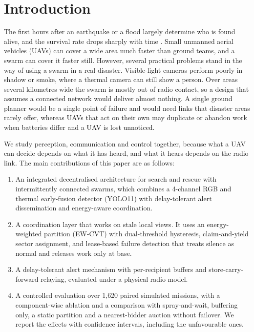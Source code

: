 \documentclass[10pt,a4paper,twocolumn]{article}
\begin{document}
\section{Introduction}
The first hours after an earthquake or a flood largely determine who is found alive, and the survival rate drops sharply with time \cite{speth2022}. Small unmanned aerial vehicles (UAVs) can cover a wide area much faster than ground teams, and a swarm can cover it faster still. However, several practical problems stand in the way of using a swarm in a real disaster. Visible-light cameras perform poorly in shadow or smoke, where a thermal camera can still show a person. Over areas several kilometres wide the swarm is mostly out of radio contact, so a design that assumes a connected network would deliver almost nothing. A single ground planner would be a single point of failure and would need links that disaster areas rarely offer, whereas UAVs that act on their own may duplicate or abandon work when batteries differ and a UAV is lost unnoticed.

We study perception, communication and control together, because what a UAV can decide depends on what it has heard, and what it hears depends on the radio link. The main contributions of this paper are as follows:
\begin{enumerate}
\item An integrated decentralised architecture for search and rescue with intermittently connected swarms, which combines a 4-channel RGB and thermal early-fusion detector (YOLO11) with delay-tolerant alert dissemination and energy-aware coordination.
\item A coordination layer that works on stale local views. It uses an energy-weighted partition (EW-CVT) with dual-threshold hysteresis, claim-and-yield sector assignment, and lease-based failure detection that treats silence as normal and releases work only at base.
\item A delay-tolerant alert mechanism with per-recipient buffers and store-carry-forward relaying, evaluated under a physical radio model.
\item A controlled evaluation over 1{,}620 paired simulated missions, with a component-wise ablation and a comparison with spray-and-wait, buffering only, a static partition and a nearest-bidder auction without failover. We report the effects with confidence intervals, including the unfavourable ones.
\end{enumerate}
\end{document}
